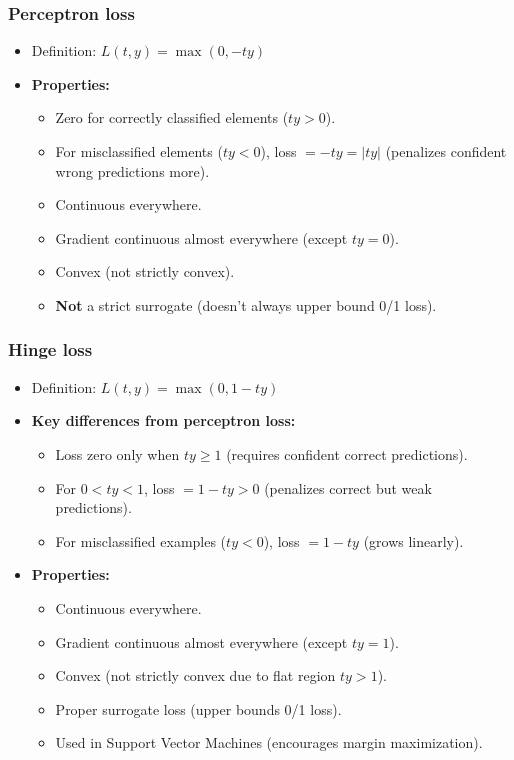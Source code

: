 \subsubsection*{Perceptron loss}
\begin{itemize}
    \item Definition: $L(t,y)=\max{}(0, -ty)$
    \item \textbf{Properties:}
    \begin{itemize}
        \item Zero for correctly classified elements ($ty > 0$).
        \item For misclassified elements ($ty < 0$), loss $= -ty = |ty|$ (penalizes confident wrong predictions more).
        \item Continuous everywhere.
        \item Gradient continuous almost everywhere (except $ty=0$).
        \item Convex (not strictly convex).
        \item \textbf{Not} a strict surrogate (doesn't always upper bound 0/1 loss).
    \end{itemize}
\end{itemize}

\subsubsection*{Hinge loss}
\begin{itemize}
    \item Definition: $L(t,y)=\max(0, 1-ty)$
    \item \textbf{Key differences from perceptron loss:}
    \begin{itemize}
        \item Loss zero only when $ty \geq 1$ (requires confident correct predictions).
        \item For $0 < ty < 1$, loss $= 1-ty > 0$ (penalizes correct but weak predictions).
        \item For misclassified examples ($ty < 0$), loss $= 1-ty$ (grows linearly).
    \end{itemize}
    \item \textbf{Properties:}
    \begin{itemize}
        \item Continuous everywhere.
        \item Gradient continuous almost everywhere (except $ty=1$).
        \item Convex (not strictly convex due to flat region $ty > 1$).
        \item Proper surrogate loss (upper bounds 0/1 loss).
        \item Used in Support Vector Machines (encourages margin maximization).
    \end{itemize}
\end{itemize}

